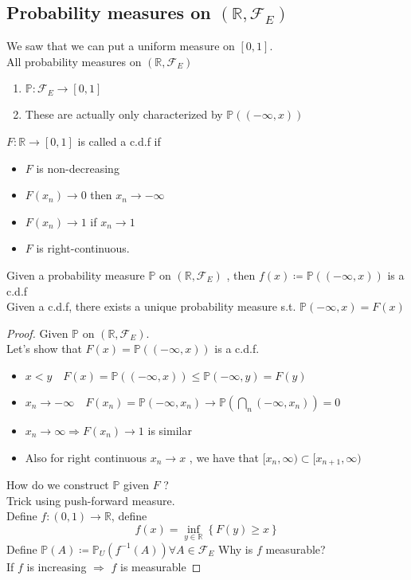 \documentclass[../main.tex]{subfiles}
\begin{document}
\subsection{Probability measures on $ ( \mathbb{R}, \mathcal{F}_E) $ }
We saw that we can put a uniform measure on $ [ 0,1] $.\\
All probability measures on $ ( \mathbb{R}, \mathcal{F}_E) $ 
\begin{enumerate}
\item $ \mathbb{P}: \mathcal{F}_E\to [ 0,1] $ 
\item These are actually only characterized by $ \mathbb{P}( ( - \infty,x ) ) $ 
\end{enumerate}
\begin{defn}
	$F: \mathbb{R}\to [ 0,1] $ is called a c.d.f if
	\begin{itemize}
	\item $F$ is non-decreasing
	\item $F( x_n) \to 0 $ then $ x_n \to - \infty $ 
	\item $F( x_n) \to 1$ if $x_n \to 1$ 
	\item $F$ is right-continuous.
	\end{itemize}
	
\end{defn}
\begin{thm}
	Given a probability measure $ \mathbb{P}$ on $ ( \mathbb{R}, \mathcal{F}_E) $ , then $f( x) \coloneqq \mathbb{P}( ( - \infty ,x) ) $ is a c.d.f\\
	Given a c.d.f, there exists a  unique probability measure s.t. $ \mathbb{P}( - \infty ,x) = F( x) $ 
\end{thm}
\begin{proof}
	Given $ \mathbb{P}$ on $ ( \mathbb{R}, \mathcal{F}_E) $.\\
	Let's show that $F( x) = \mathbb{P}( ( - \infty , x) ) $ is a c.d.f.
	\begin{itemize}
		\item $x<y\quad F( x) = \mathbb{P}( ( - \infty ,x) ) \leq \mathbb{P}(  - \infty ,y) =F( y) $
		\item $x_n\to - \infty \quad F( x_n) = \mathbb{P}( - \infty ,x_n) \to \mathbb{P}(  \bigcap_{n} ( - \infty , x_n) ) =0 $  
		\item $x_n \to \infty \Rightarrow F( x_n ) \to 1$ is similar
		\item Also for right continuous $x_n \to x$ , we have that $ [ x_n, \infty ) \subset [ x_{n+1} , \infty )  $ 
	\end{itemize}
How do we construct $ \mathbb{P}$ given $F$ ?\\
Trick using push-forward measure.\\
Define $f: ( 0,1) \to \mathbb{R}$, define
\[ 
	f( x) = \inf_{y \in \mathbb{R}} \left\{ F( y) \geq x \right\} 
\]
Define $ \mathbb{P}( A) \coloneqq \mathbb{P}_U ( f^{-1}( A) )\forall A \in \mathcal{F}_E $ 
Why is $f$ measurable?\\
If $f$ is increasing $\Rightarrow$ $f$ is measurable

	
\end{proof}
\end{document}
